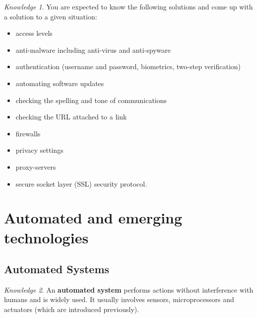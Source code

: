 \documentclass[8pt]{article}
\theoremstyle{remark}
\newtheorem{knowledge}{Knowledge}[subsection]
\begin{document}
            \begin{knowledge}
                You are expected to know the following solutions and come up with a solution to a given situation:
                \begin{itemize}
                    \item access levels
                    \item anti-malware including anti-virus and anti-spyware
                    \item authentication (username and password, biometrics, two-step verification)
                    \item automating software updates
                    \item checking the spelling and tone of communications
                    \item checking the URL attached to a link
                    \item firewalls
                    \item privacy settings
                    \item proxy-servers
                    \item secure socket layer (SSL) security protocol.
                \end{itemize}
            \end{knowledge}

    \section{Automated and emerging technologies}

        \subsection{Automated Systems}
            \begin{knowledge}
                An \textbf{automated system} performs actions without interference with humans and is widely used. It usually involves sensors, microprocessors and actuators (which are introduced previously).
            \end{knowledge}
\end{document}
